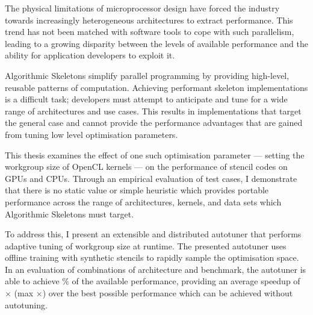 The physical limitations of microprocessor design have forced the
industry towards increasingly heterogeneous architectures to extract
performance. This trend has not been matched with software tools to
cope with such parallelism, leading to a growing disparity between the
levels of available performance and the ability for application
developers to exploit it.

Algorithmic Skeletons simplify parallel programming by providing
high-level, reusable patterns of computation. Achieving performant
skeleton implementations is a difficult task; developers must attempt
to anticipate and tune for a wide range of architectures and use
cases. This results in implementations that target the general case
and cannot provide the performance advantages that are gained from
tuning low level optimisation parameters.

This thesis examines the effect of one such optimisation parameter ---
setting the workgroup size of OpenCL kernels --- on the performance of
stencil codes on GPUs and CPUs. Through an empirical evaluation of
 test cases, I demonstrate that there is
no static value or simple heuristic which provides portable
performance across the range of architectures, kernels, and data sets
which Algorithmic Skeletons must target.

To address this, I present an extensible and distributed autotuner
that performs adaptive tuning of workgroup size at runtime. The
presented autotuner uses offline training with synthetic stencils to
rapidly sample the optimisation space. In an evaluation of
 combinations of architecture and benchmark,
the autotuner is able to achieve
$\%$ of the available
performance, providing an average speedup of
$\times$ (max
$\times$) over the best
possible performance which can be achieved without autotuning.

